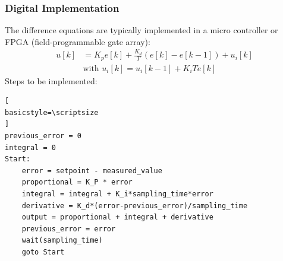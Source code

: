 \begin{frame}[fragile]
	\frametitle{Digital Implementation}
	\small{
	The difference equations are typically implemented in a micro controller or FPGA (field-programmable gate array):
		\begin{align*}
		u[k] &= K_p e[k] + \frac{K_d}{T}(e[k] - e[k-1])+u_i[k] \\
		&\text{with } u_i[k] = u_i[k-1] + K_i T e[k]
		\end{align*}
	Steps to be implemented:}
\begin{lstlisting}[
basicstyle=\scriptsize
]
previous_error = 0
integral = 0
Start:
	error = setpoint - measured_value
	proportional = K_P * error
	integral = integral + K_i*sampling_time*error
	derivative = K_d*(error-previous_error)/sampling_time
	output = proportional + integral + derivative
	previous_error = error
	wait(sampling_time)
	goto Start
	\end{lstlisting}
\end{frame}

